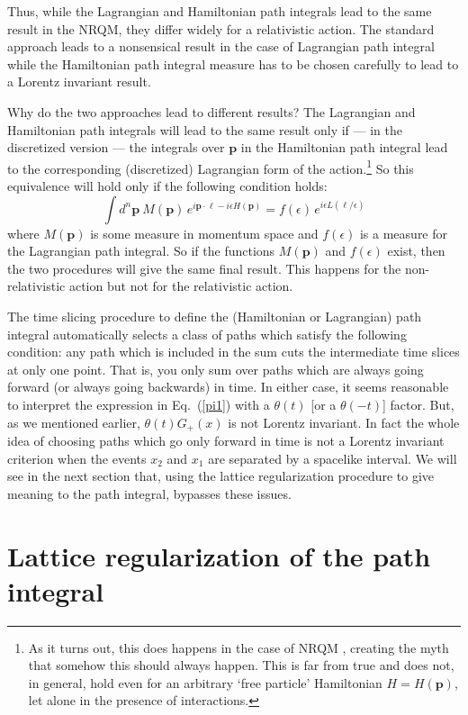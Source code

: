 \documentclass[12pt]{article}
\def\eq#1{{Eq.~(\ref{#1})}}
\begin{document}
Thus, while the Lagrangian and Hamiltonian path integrals lead to the same result in the NRQM, they differ widely for a relativistic action. The standard approach leads to a nonsensical result in the case of Lagrangian path integral while the Hamiltonian path integral measure has to be chosen carefully to lead to a Lorentz invariant result. 

Why do the two approaches lead to different results?
The Lagrangian and Hamiltonian path integrals  will lead to the same result  only if --- in the discretized version --- the integrals over $\bm{p}$ in the Hamiltonian path integral lead to the corresponding (discretized) Lagrangian form of the action.\footnote{As it turns out, this does happens in the case of NRQM , creating the myth that somehow this should always happen. This is far from true and does not, in general, hold even for an arbitrary `free particle' Hamiltonian $H=H(\bm{p})$, let alone in the presence of interactions.} So this  equivalence will hold only if the following condition holds: 
\begin{equation}
 \int d^n \bm{p} \ M(\bm{p}) \, e^{i\bm{p\cdot \ell} - i \epsilon H(\bm{p})} = f(\epsilon) \, e^{i\epsilon L(\bm{\ell}/\epsilon)}
\label{hlequiv} 
\end{equation}  
where $M(\bm{p})$ is some measure in momentum space and $f(\epsilon)$ is a measure for the Lagrangian path integral. So if the functions $M(\bm{p})$ and 
$f(\epsilon)$ exist, then the two procedures will give the same final result. 
This happens  for the non-relativistic action but not for the relativistic action. 

The time slicing procedure to define the (Hamiltonian or Lagrangian) path integral automatically selects a class of paths which satisfy the following condition: any path which is included in the sum cuts the intermediate time slices at only one point. That is, you only sum over paths which are always going forward (or always going backwards) in time. In either case, it seems reasonable to  interpret the expression in \eq{pi1} with a $\theta(t)$ [or a $\theta(-t)$] factor. But, as we mentioned earlier, $\theta(t)G_+(x)$ is not Lorentz invariant. In fact the whole idea of choosing paths which go only forward in time is not a Lorentz invariant criterion when the events $x_2$ and $x_1$ are separated by a spacelike interval. We will see in the next section that, using the lattice regularization procedure to give meaning to the path integral, bypasses these issues.


\section{Lattice regularization of the path integral}\label{sec:lattice}
\end{document}
